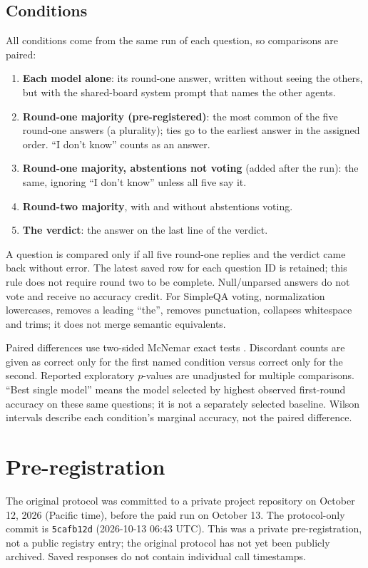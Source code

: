 \documentclass[11pt]{article}
\begin{document}
\subsection{Conditions}
All conditions come from the same run of each question, so comparisons are paired:
\begin{enumerate}
  \item \textbf{Each model alone}: its round-one answer, written without seeing the others, but with the shared-board system prompt that names the other agents.
  \item \textbf{Round-one majority (pre-registered)}: the most common of the five round-one answers (a plurality); ties go to the earliest answer in the assigned order. ``I don't know'' counts as an answer.
  \item \textbf{Round-one majority, abstentions not voting} (added after the run): the same, ignoring ``I don't know'' unless all five say it.
  \item \textbf{Round-two majority}, with and without abstentions voting.
  \item \textbf{The verdict}: the answer on the last line of the verdict.
\end{enumerate}
A question is compared only if all five round-one replies and the verdict came back without error. The latest saved row for each question ID is retained; this rule does not require round two to be complete. Null/unparsed answers do not vote and receive no accuracy credit. For SimpleQA voting, normalization lowercases, removes a leading ``the'', removes punctuation, collapses whitespace and trims; it does not merge semantic equivalents.

Paired differences use two-sided McNemar exact tests \citep{mcnemar1947}. Discordant counts are given as correct only for the first named condition versus correct only for the second. Reported exploratory $p$-values are unadjusted for multiple comparisons. ``Best single model'' means the model selected by highest observed first-round accuracy on these same questions; it is not a separately selected baseline. Wilson intervals describe each condition's marginal accuracy, not the paired difference.

\section{Pre-registration}
\label{sec:prereg-text}
The original protocol was committed to a private project repository on October 12, 2026 (Pacific time), before the paid run on October 13. The protocol-only commit is \texttt{5cafb12d} (2026-10-13 06:43 UTC). This was a private pre-registration, not a public registry entry; the original protocol has not yet been publicly archived. Saved responses do not contain individual call timestamps.
\end{document}
